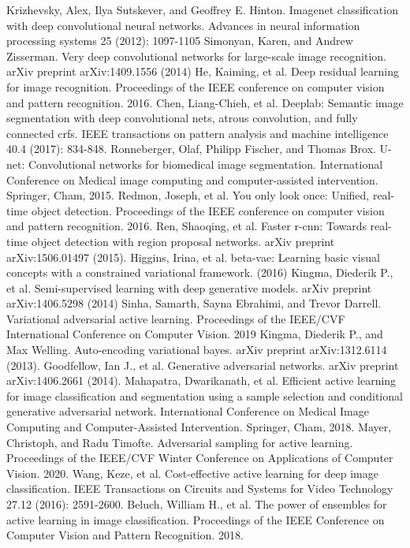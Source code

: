 \documentclass[runningheads]{llncs}
\begin{document}
\begin{thebibliography}{8}
    Krizhevsky, Alex, Ilya Sutskever, and Geoffrey E. Hinton. Imagenet classification with deep convolutional neural networks. Advances in neural information processing systems 25 (2012): 1097-1105
    Simonyan, Karen, and Andrew Zisserman. Very deep convolutional networks for large-scale image recognition. arXiv preprint arXiv:1409.1556 (2014)
    He, Kaiming, et al. Deep residual learning for image recognition. Proceedings of the IEEE conference on computer vision and pattern recognition. 2016.
    Chen, Liang-Chieh, et al. Deeplab: Semantic image segmentation with deep convolutional nets, atrous convolution, and fully connected crfs. IEEE transactions on pattern analysis and machine intelligence 40.4 (2017): 834-848.
    Ronneberger, Olaf, Philipp Fischer, and Thomas Brox. U-net: Convolutional networks for biomedical image segmentation. International Conference on Medical image computing and computer-assisted intervention. Springer, Cham, 2015.
    Redmon, Joseph, et al. You only look once: Unified, real-time object detection. Proceedings of the IEEE conference on computer vision and pattern recognition. 2016.
    Ren, Shaoqing, et al. Faster r-cnn: Towards real-time object detection with region proposal networks. arXiv preprint arXiv:1506.01497 (2015).
    Higgins, Irina, et al. beta-vae: Learning basic visual concepts with a constrained variational framework. (2016)
    Kingma, Diederik P., et al. Semi-supervised learning with deep generative models. arXiv preprint arXiv:1406.5298 (2014)
    Sinha, Samarth, Sayna Ebrahimi, and Trevor Darrell. Variational adversarial active learning. Proceedings of the IEEE/CVF International Conference on Computer Vision. 2019
    Kingma, Diederik P., and Max Welling. Auto-encoding variational bayes. arXiv preprint arXiv:1312.6114 (2013).
    Goodfellow, Ian J., et al. Generative adversarial networks. arXiv preprint arXiv:1406.2661 (2014).
    Mahapatra, Dwarikanath, et al. Efficient active learning for image classification and segmentation using a sample selection and conditional generative adversarial network. International Conference on Medical Image Computing and Computer-Assisted Intervention. Springer, Cham, 2018.
    Mayer, Christoph, and Radu Timofte. Adversarial sampling for active learning. Proceedings of the IEEE/CVF Winter Conference on Applications of Computer Vision. 2020.
    Wang, Keze, et al. Cost-effective active learning for deep image classification. IEEE Transactions on Circuits and Systems for Video Technology 27.12 (2016): 2591-2600.
    Beluch, William H., et al. The power of ensembles for active learning in image classification. Proceedings of the IEEE Conference on Computer Vision and Pattern Recognition. 2018.
\end{thebibliography}
\end{document}
